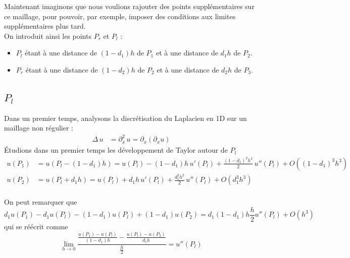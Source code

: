 \documentclass[11pt,a4paper]{article}
\begin{document}
Maintenant imaginons que nous voulions rajouter des points supplémentaires sur ce maillage, pour pouvoir, par exemple, imposer des conditions aux limites supplémentaires plus tard.\\

\noindent On introduit ainsi les points $P_r$ et $P_l$ :
\begin{itemize}
\item $P_l$ étant à une distance de $(1-d_1)h$ de $P_1$ et à une distance de $d_1h$ de $P_2$.
\item $P_r$ étant à une distance de $(1-d_2)h$ de $P_2$ et à une distance de $d_2h$ de $P_3$.
\end{itemize}

\subsection{$P_l$}

Dans un premier temps, analysons la discrétisation du Laplacien en 1D sur un maillage non régulier :
\begin{align*}
\Delta\,u &= \partial_x^2\,u = \partial_x (\partial_x u)
\end{align*}
Étudions dans un premier temps les développement de Taylor autour de $P_l$
\begin{align*}
u \left(P_1\right) &= u \left(P_l-\left(1-d_1\right)h\right) = u \left(P_l\right) - \left(1-d_1\right)h\,u'\left(P_l\right) + \frac{\left(1-d_1\right)^2h^2}{2}\,u''(P_l) + O\left(\left(1-d_1\right)^3h^3\right)\\
u (P_2) &= u \left(P_l+d_1h\right) = u \left(P_l\right) + d_1h\,u'\left(P_l\right) + \frac{d_1^2h^2}{2}\,u''\left(P_l\right) + O\left(d_1^3h^3\right)\\
\end{align*}

On peut remarquer que 
\begin{equation}
d_1u \left(P_1\right) - d_1u\left(P_l\right) - (1-d_1)u\left(P_l\right) + \left(1-d_1\right) u (P_2) = d_1(1-d_1)h\frac{h}{2}u''\left(P_l\right) + O(h^3)
\end{equation}
qui se réécrit comme
\begin{equation}
\lim_{h\to0}\frac{\frac{u(P_1)- u (P_l)}{(1-d_1)h} - \frac{u (P_l) - u (P_2)}{d_1h}}{\frac{h}{2}} = u''(P_l)
\end{equation}
\end{document}
